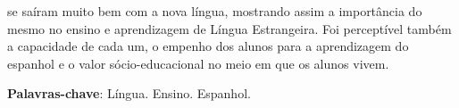 \documentclass[article,12pt,onesidea,4paper,english,brazil]{abntex2}
\begin{document}
se saíram muito bem com a nova língua, mostrando assim a importância do mesmo no ensino e aprendizagem de Língua Estrangeira. Foi perceptível também a capacidade de cada um, o empenho dos alunos para a aprendizagem do espanhol e o valor sócio-educacional no meio em que os alunos vivem.
	
	\vspace{\onelineskip}
	
	\noindent
	\textbf{Palavras-chave}: Língua. Ensino. Espanhol.
	
\end{document}
